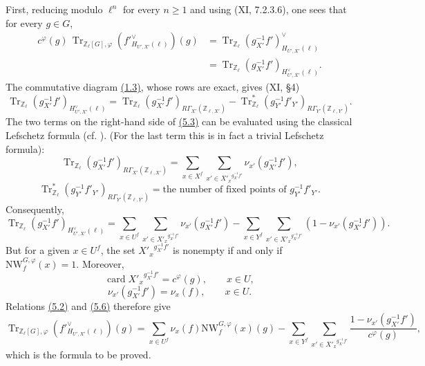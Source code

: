 \documentclass[11pt]{article}
\providecommand{\Tr}{\operatorname{Tr}}
\providecommand{\Tr}{\operatorname{Tr}}
\providecommand{\Tr}{\operatorname{Tr}}
\providecommand{\Tr}{\operatorname{Tr}}
\providecommand{\bZ}{\mathbb Z}
\providecommand{\card}{\operatorname{card}}
\providecommand{\Tr}{\operatorname{Tr}}
\begin{document}
First, reducing modulo $\ell^n$ for every $n\ge1$ and using (XI, 7.2.3.6), one sees that for every $g\in G$,
\begin{equation}\tag{5.2}\label{sga5:XII:equation:5.2}
\begin{aligned}
c^\varphi(g)\,\Tr_{\bZ_\ell[G],\varphi}(f'^\vee_{H_{U',X'}(\ell)})(g)
&=\Tr_{\bZ_\ell}(g_{X'}^{-1}f')^\vee_{H_{U',X'}(\ell)}\\
&=\Tr_{\bZ_\ell}(g_{X'}^{-1}f')_{H^\vee_{U',X'}(\ell)}.
\end{aligned}
\end{equation}
The commutative diagram \hyperref[sga5:XII:equation:1.3]{(1.3)}, whose rows are exact, gives (XI, \S4)
\begin{equation}\tag{5.3}\label{sga5:XII:equation:5.3}
\Tr_{\bZ_\ell}(g_{X'}^{-1}f')_{H^\vee_{U',X'}(\ell)}
=\Tr_{\bZ_\ell}(g_{X'}^{-1}f')_{R\Gamma_{X'}(\bZ_{\ell,X'})}
-\Tr^*_{\bZ_\ell}(g_{Y'}^{-1}f'_{Y'})_{R\Gamma_{Y'}(\bZ_{\ell,Y'})}.
\end{equation}
The two terms on the right-hand side of \hyperref[sga5:XII:equation:5.3]{(5.3)} can be evaluated using the classical Lefschetz formula (cf. ). (For the last term this is in fact a trivial Lefschetz formula):
\begin{equation}\tag{5.4}\label{sga5:XII:equation:5.4}
\Tr_{\bZ_\ell}(g_{X'}^{-1}f')_{R\Gamma_{X'}(\bZ_{\ell,X'})}
=\sum_{x\in X^f}\sum_{x'\in {X'_x}^{g_{X'}^{-1}f'}}\nu_{x'}(g_{X'}^{-1}f'),
\end{equation}
\begin{equation}\tag{5.5}\label{sga5:XII:equation:5.5}
\Tr^*_{\bZ_\ell}(g_{Y'}^{-1}f'_{Y'})_{R\Gamma_{Y'}(\bZ_{\ell,Y'})}
=\text{the number of fixed points of }g_{Y'}^{-1}f'_{Y'}.
\end{equation}
Consequently,
\begin{equation}\tag{5.6}\label{sga5:XII:equation:5.6}
\Tr_{\bZ_\ell}(g_{X'}^{-1}f')_{H^\vee_{U',X'}(\ell)}
=\sum_{x\in U^f}\sum_{x'\in {X'_x}^{g_{X'}^{-1}f'}}\nu_{x'}(g_{X'}^{-1}f')
-\sum_{x\in Y^f}\sum_{x'\in {X'_x}^{g_{X'}^{-1}f'}}(1-\nu_{x'}(g_{X'}^{-1}f')).
\end{equation}
But for a given $x\in U^f$, the set ${X'_x}^{g_{X'}^{-1}f'}$ is nonempty if and only if $\mathrm{NW}_{f}^{G,\varphi}(x)=1$. Moreover,
\begin{equation}\tag{5.7}\label{sga5:XII:equation:5.7}
\card {X'_x}^{g_{X'}^{-1}f'}=c^\varphi(g),
\qquad x\in U,
\end{equation}
\begin{equation}\tag{5.8}\label{sga5:XII:equation:5.8}
\nu_{x'}(g_{X'}^{-1}f')=\nu_x(f),
\qquad x\in U.
\end{equation}
Relations \hyperref[sga5:XII:equation:5.2]{(5.2)} and \hyperref[sga5:XII:equation:5.6]{(5.6)} therefore give
\begin{equation}\tag{5.9}\label{sga5:XII:equation:5.9}
\Tr_{\bZ_\ell[G],\varphi}(f'^\vee_{H_{U',X'}(\ell)})(g)
=\sum_{x\in U^f}\nu_x(f)\mathrm{NW}_f^{G,\varphi}(x)(g)
-\sum_{x\in Y^f}\sum_{x'\in {X'_x}^{g_{X'}^{-1}f'}}
\frac{1-\nu_{x'}(g_{X'}^{-1}f')}{c^\varphi(g)},
\end{equation}
which is the formula to be proved.
\end{document}
